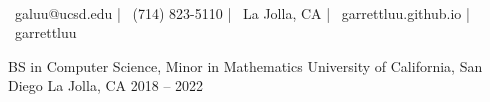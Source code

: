 \documentclass[]{awesome-cv}
\begin{document}
\begin{center}
	\vspace{-5mm}
	  \\
	\vspace{2mm}
  {\faEnvelope\ galuu@ucsd.edu} | {\faMobile\ (714) 823-5110} | {\faMapMarker\ La Jolla, CA} | {\faLink\ garrettluu.github.io} | {\faLinkedinSquare\ garrettluu}
\end{center}
\vspace{-3mm}
\begin{cventries}
	\cventry
	{BS in Computer Science, Minor in Mathematics}
	{University of California, San Diego}
	{La Jolla, CA}
	{2018 – 2022}
	{}
\end{cventries}
\end{document}
